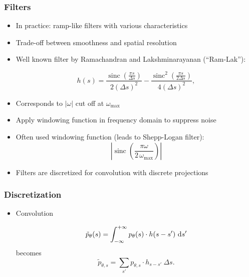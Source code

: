 \begin{frame}
	\frametitle{Filters}

	\begin{itemize}
		\item In practice: ramp-like filters with various characteristics
		\item Trade-off between smoothness and spatial resolution
		\item Well known filter by Ramachandran and Lakshminarayanan (``Ram-Lak''):

		      \begin{equation}
			      h(s) = \frac{\operatorname{sinc}\left(\frac{\pi s}{\Delta s}\right)}{2 (\Delta s)^2} - \frac{\operatorname{sinc}^2\left(\frac{\pi s}{2\Delta s}\right)}{4 (\Delta s)^2},
		      \end{equation}

		\item Corresponds to $|\omega|$ cut off at $\omega_\text{max}$

		\item Apply windowing function in frequency domain to suppress noise
		\item Often used windowing function (leads to Shepp-Logan filter):
		      \begin{equation}
			      \left|\operatorname{sinc}\left(\frac{\pi \omega}{2\,\omega_\text{max}}\right)\right|
		      \end{equation}

		\item Filters are discretized for convolution with discrete projections
	\end{itemize}

\end{frame}

\begin{frame}
	\frametitle{Discretization}

	\begin{itemize}
		\item Convolution


		      \begin{equation}
			      \tilde{p}_{\theta}(s) = \int_{-\infty}^{+\infty} p_\theta(s) \cdot h(s - s') \ \textnormal d s'
		      \end{equation}
		      becomes
		      \begin{equation}
			      \tilde{p}_{\theta, s} = \sum_{s'} p_{\theta, s} \cdot h_{s - s'}\ \Delta s.
		      \end{equation}

		
	\end{itemize}

\end{frame}


